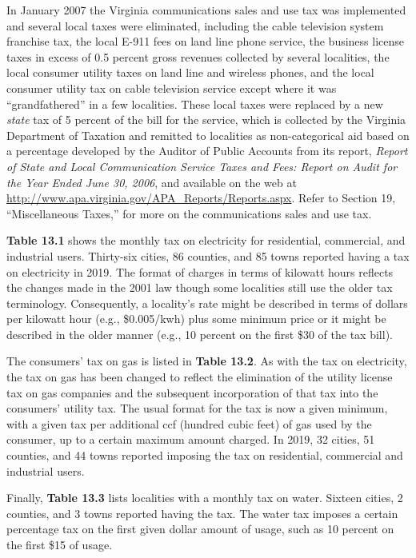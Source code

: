 \documentclass[
]{book}
\begin{document}
In January 2007 the Virginia communications sales and use tax was implemented and several local taxes were eliminated, including the cable television system franchise tax, the local E-911 fees on land line phone service, the business license taxes in excess of 0.5 percent gross revenues collected by several localities, the local consumer utility taxes on land line and wireless phones, and the local consumer utility tax on cable television service except where it was ``grandfathered'' in a few localities. These local taxes were replaced by a new \emph{state} tax of 5 percent of the bill for the service, which is collected by the Virginia Department of Taxation and remitted to localities as non-categorical aid based on a percentage developed by the Auditor of Public Accounts from its report, \emph{Report of State and Local Communication Service Taxes and Fees: Report on Audit for the Year Ended June 30, 2006}, and available on the web at \url{http://www.apa.virginia.gov/APA_Reports/Reports.aspx}. Refer to Section 19, ``Miscellaneous Taxes,'' for more on the communications sales and use tax.

\textbf{Table 13.1} shows the monthly tax on electricity for residential, commercial, and industrial users. Thirty-six cities, 86 counties, and 85 towns reported having a tax on electricity in 2019. The format of charges in terms of kilowatt hours reflects the changes made in the 2001 law though some localities still use the older tax terminology. Consequently, a locality's rate might be described in terms of dollars per kilowatt hour (e.g., \$0.005/kwh) plus some minimum price or it might be described in the older manner (e.g., 10 percent on the first \$30 of the tax bill).

The consumers' tax on gas is listed in \textbf{Table 13.2}. As with the tax on electricity, the tax on gas has been changed to reflect the elimination of the utility license tax on gas companies and the subsequent incorporation of that tax into the consumers' utility tax. The usual format for the tax is now a given minimum, with a given tax per additional ccf (hundred cubic feet) of gas used by the consumer, up to a certain maximum amount charged. In 2019, 32 cities, 51 counties, and 44 towns reported imposing the tax on residential, commercial and industrial users.

Finally, \textbf{Table 13.3} lists localities with a monthly tax on water. Sixteen cities, 2 counties, and 3 towns reported having the tax. The water tax imposes a certain percentage tax on the first given dollar amount of usage, such as 10 percent on the first \$15 of usage.
\end{document}
